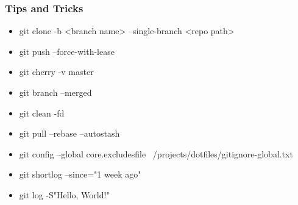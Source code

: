 \documentclass{beamer}
\begin{document}
\begin{frame}
	\frametitle{Tips and Tricks}
	\begin{itemize}
		\item{git clone -b <branch name> --single-branch  <repo path>}
		\item{git push --force-with-lease}
		\item{git cherry -v master}
		\item{git branch --merged}
		\item{git clean -fd}
		\item{git pull --rebase --autostash}
		\item{git config --global core.excludesfile ~/projects/dotfiles/gitignore-global.txt}
		\item{git shortlog --since="1 week ago"}
		\item{git log -S"Hello, World!"}
	\end{itemize}
\end{frame}
\end{document}
